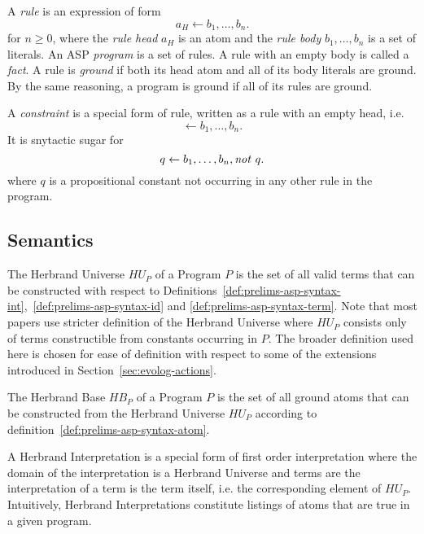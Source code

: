 \begin{definition}
\label{def:prelims-asp-syntax-rule}
A \emph{rule} is an expression of form
\[
	a_H \leftarrow b_1,\ldots,b_n.
\]
for $n \geq 0$, where the \emph{rule head} $a_H$ is an atom and the \emph{rule body} $b_1,\ldots,b_n$ is a set of literals. An ASP \emph{program} is a set of rules. A rule with an empty body is called a \emph{fact}. A rule is \emph{ground} if both its head atom and all of its body literals are ground. By the same reasoning, a program is ground if all of its rules are ground.
\end{definition}

\begin{definition}[Constraint]
\label{def:prelims-asp-syntax-constraint}
A \emph{constraint} is a special form of rule, written as a rule with an empty head, i.e.
\[
	\leftarrow b_1,\ldots,b_n.
\]
It is snytactic sugar for
\[
	q \leftarrow b_1,\ldots,b_n, \mathit{not}\ q.
\]
where $q$ is a propositional constant not occurring in any other rule in the program.
\end{definition}

\subsection{Semantics}
\label{subsec:prelims-asp-semantics}

\begin{definition}
\label{def:prelims-asp-semantics-hu}
The Herbrand Universe $HU_P$ of a Program $P$ is the set of all valid terms that can be constructed with respect to Definitions~\ref{def:prelims-asp-syntax-int},~\ref{def:prelims-asp-syntax-id} and \ref{def:prelims-asp-syntax-term}.
Note that most papers use stricter definition of the Herbrand Universe where $HU_P$ consists only of terms constructible from constants occurring in $P$. The broader definition used here is chosen for ease of definition with respect to some of the extensions introduced in Section~\ref{sec:evolog-actions}.
\end{definition}

\begin{definition}
\label{def:prelims-asp-semantics-hb}
The Herbrand Base $HB_P$ of a Program $P$ is the set of all ground atoms that can be constructed from the Herbrand Universe $HU_P$ according to definition~\ref{def:prelims-asp-syntax-atom}. 
\end{definition}

\begin{definition}
\label{def:prelims-asp-semantics-herbrand-interpretation}
A Herbrand Interpretation is a special form of first order interpretation where the domain of the interpretation is a Herbrand Universe and terms are the interpretation of a term is the term itself, i.e. the corresponding element of $HU_P$. Intuitively, Herbrand Interpretations constitute listings of atoms that are true in a given program.
\end{definition}

